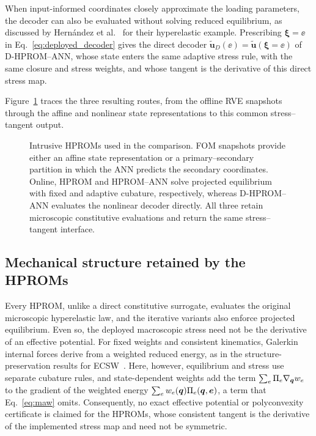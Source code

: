 When input-informed coordinates closely approximate the loading parameters, the decoder can also be evaluated without solving reduced equilibrium, as discussed by Hern\'andez et al.~\cite{hernandez2026dimensional} for their hyperelastic example. Prescribing $\bm\xi=\ee$ in Eq.~\eqref{eq:deployed_decoder} gives the direct decoder $\widetilde{\bm u}_{D}(\ee)=\widetilde{\bm u}(\bm\xi=\ee)$ of D-HPROM--ANN, whose state enters the same adaptive stress rule, with the same closure and stress weights, and whose tangent is the derivative of this direct stress map.

Figure~\ref{fig:reduced_model_hierarchy} traces the three resulting routes, from the offline RVE snapshots through the affine and nonlinear state representations to this common stress--tangent output.

\begin{figure}[p]
 \centering
 \caption{Intrusive HPROMs used in the comparison. FOM snapshots provide either an affine state representation or a primary--secondary partition in which the ANN predicts the secondary coordinates. Online, HPROM and HPROM--ANN solve projected equilibrium with fixed and adaptive cubature, respectively, whereas D-HPROM--ANN evaluates the nonlinear decoder directly. All three retain microscopic constitutive evaluations and return the same stress--tangent interface.}
\label{fig:reduced_model_hierarchy}
\end{figure}


\subsection{Mechanical structure retained by the HPROMs}
Every HPROM, unlike a direct constitutive surrogate, evaluates the original microscopic hyperelastic law, and the iterative variants also enforce projected equilibrium. Even so, the deployed macroscopic stress need not be the derivative of an effective potential. For fixed weights and consistent kinematics, Galerkin internal forces derive from a weighted reduced energy, as in the structure-preservation results for ECSW~\cite{farhat2015}. Here, however, equilibrium and stress use separate cubature rules, and state-dependent weights add the term $\sum_e\Pi_e\nabla_{\bm q}w_e$ to the gradient of the weighted energy $\sum_e w_e(\bm q)\Pi_e(\bm q,\bm e)$, a term that Eq.~\eqref{eq:maw} omits. Consequently, no exact effective potential or polyconvexity certificate is claimed for the HPROMs, whose consistent tangent is the derivative of the implemented stress map and need not be symmetric.

